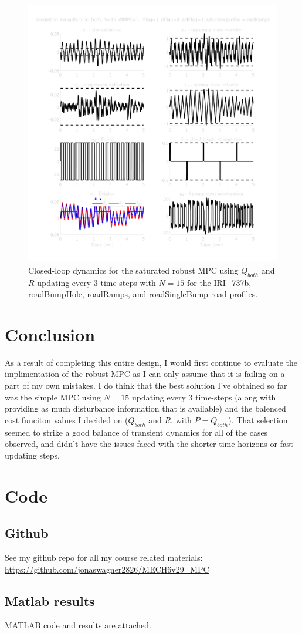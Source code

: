 \documentclass[onecolumn]{IEEEtran}
\begin{document}
\begin{figure}[!h]
    \includegraphics[width = 0.49 \columnwidth]{figs/results_mpc_both_N=15_dtMPC=3_rFlag=1_dFlag=0_satFlag=1_saturated_roadRamps.png}
    \caption{Closed-loop dynamics for the saturated robust MPC using $Q_{both}$ and $R$ updating every 3 time-steps with $N=15$ for the IRI\_737b, roadBumpHole, roadRamps, and roadSingleBump road profiles.} \label{fig:mpc_N15_dt3_d0_r1_sat1}
\end{figure}


\section{Conclusion}

As a result of completing this entire design, I would first continue to evaluate the implimentation of the robust MPC as I can only assume that it is failing on a part of my own mistakes.
I do think that the best solution I've obtained so far was the simple MPC using $N=15$ updating every 3 time-steps (along with providing as much disturbance information that is available) and the balenced cost funciton values I decided on ($Q_{both}$ and $R$, with $P=Q_{both}$).
That selection seemed to strike a good balance of transient dynamics for all of the cases observed, and didn't have the issues faced with the shorter time-horizons or fast updating steps.



\newpage \clearpage

\newpage \clearpage


\newpage
\appendix
\section{Code}
\subsection{Github}
See my github repo for all my course related materials: 
\url{https://github.com/jonaswagner2826/MECH6v29_MPC}

\subsection{Matlab results}
MATLAB code and results are attached.

\end{document}
